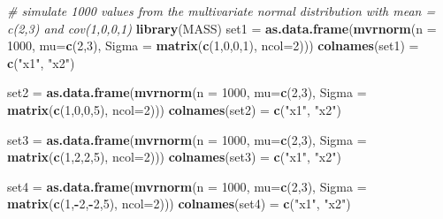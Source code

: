 \documentclass[]{article}
\newenvironment{Shaded}{\begin{snugshade}}{\end{snugshade}}
\newcommand{\KeywordTok}[1]{\textcolor[rgb]{0.13,0.29,0.53}{\textbf{#1}}}
\newcommand{\DataTypeTok}[1]{\textcolor[rgb]{0.13,0.29,0.53}{#1}}
\newcommand{\DecValTok}[1]{\textcolor[rgb]{0.00,0.00,0.81}{#1}}
\newcommand{\StringTok}[1]{\textcolor[rgb]{0.31,0.60,0.02}{#1}}
\newcommand{\CommentTok}[1]{\textcolor[rgb]{0.56,0.35,0.01}{\textit{#1}}}
\newcommand{\OperatorTok}[1]{\textcolor[rgb]{0.81,0.36,0.00}{\textbf{#1}}}
\newcommand{\NormalTok}[1]{#1}
\begin{document}
\begin{Shaded}
\begin{Highlighting}[]
\CommentTok{# simulate 1000 values from the multivariate normal distribution with mean = c(2,3) and cov(1,0,0,1)}
\KeywordTok{library}\NormalTok{(MASS)}
\NormalTok{set1 =}\StringTok{ }\KeywordTok{as.data.frame}\NormalTok{(}\KeywordTok{mvrnorm}\NormalTok{(}\DataTypeTok{n =} \DecValTok{1000}\NormalTok{, }\DataTypeTok{mu=}\KeywordTok{c}\NormalTok{(}\DecValTok{2}\NormalTok{,}\DecValTok{3}\NormalTok{), }\DataTypeTok{Sigma =} \KeywordTok{matrix}\NormalTok{(}\KeywordTok{c}\NormalTok{(}\DecValTok{1}\NormalTok{,}\DecValTok{0}\NormalTok{,}\DecValTok{0}\NormalTok{,}\DecValTok{1}\NormalTok{), }\DataTypeTok{ncol=}\DecValTok{2}\NormalTok{)))}
\KeywordTok{colnames}\NormalTok{(set1) =}\StringTok{ }\KeywordTok{c}\NormalTok{(}\StringTok{"x1"}\NormalTok{, }\StringTok{"x2"}\NormalTok{)}

\NormalTok{set2 =}\StringTok{ }\KeywordTok{as.data.frame}\NormalTok{(}\KeywordTok{mvrnorm}\NormalTok{(}\DataTypeTok{n =} \DecValTok{1000}\NormalTok{, }\DataTypeTok{mu=}\KeywordTok{c}\NormalTok{(}\DecValTok{2}\NormalTok{,}\DecValTok{3}\NormalTok{), }\DataTypeTok{Sigma =} \KeywordTok{matrix}\NormalTok{(}\KeywordTok{c}\NormalTok{(}\DecValTok{1}\NormalTok{,}\DecValTok{0}\NormalTok{,}\DecValTok{0}\NormalTok{,}\DecValTok{5}\NormalTok{), }\DataTypeTok{ncol=}\DecValTok{2}\NormalTok{)))}
\KeywordTok{colnames}\NormalTok{(set2) =}\StringTok{ }\KeywordTok{c}\NormalTok{(}\StringTok{"x1"}\NormalTok{, }\StringTok{"x2"}\NormalTok{)}

\NormalTok{set3 =}\StringTok{ }\KeywordTok{as.data.frame}\NormalTok{(}\KeywordTok{mvrnorm}\NormalTok{(}\DataTypeTok{n =} \DecValTok{1000}\NormalTok{, }\DataTypeTok{mu=}\KeywordTok{c}\NormalTok{(}\DecValTok{2}\NormalTok{,}\DecValTok{3}\NormalTok{), }\DataTypeTok{Sigma =} \KeywordTok{matrix}\NormalTok{(}\KeywordTok{c}\NormalTok{(}\DecValTok{1}\NormalTok{,}\DecValTok{2}\NormalTok{,}\DecValTok{2}\NormalTok{,}\DecValTok{5}\NormalTok{), }\DataTypeTok{ncol=}\DecValTok{2}\NormalTok{)))}
\KeywordTok{colnames}\NormalTok{(set3) =}\StringTok{ }\KeywordTok{c}\NormalTok{(}\StringTok{"x1"}\NormalTok{, }\StringTok{"x2"}\NormalTok{)}

\NormalTok{set4 =}\StringTok{ }\KeywordTok{as.data.frame}\NormalTok{(}\KeywordTok{mvrnorm}\NormalTok{(}\DataTypeTok{n =} \DecValTok{1000}\NormalTok{, }\DataTypeTok{mu=}\KeywordTok{c}\NormalTok{(}\DecValTok{2}\NormalTok{,}\DecValTok{3}\NormalTok{), }\DataTypeTok{Sigma =} \KeywordTok{matrix}\NormalTok{(}\KeywordTok{c}\NormalTok{(}\DecValTok{1}\NormalTok{,}\OperatorTok{-}\DecValTok{2}\NormalTok{,}\OperatorTok{-}\DecValTok{2}\NormalTok{,}\DecValTok{5}\NormalTok{), }\DataTypeTok{ncol=}\DecValTok{2}\NormalTok{)))}
\KeywordTok{colnames}\NormalTok{(set4) =}\StringTok{ }\KeywordTok{c}\NormalTok{(}\StringTok{"x1"}\NormalTok{, }\StringTok{"x2"}\NormalTok{)}
\end{Highlighting}
\end{Shaded}
\end{document}
